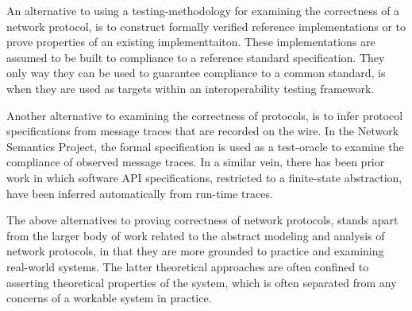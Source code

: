 \documentclass[acmsmall,review,authorversion]{acmart}
\begin{document}
{An alternative to using a testing-methodology for examining the correctness of a network protocol, is to construct formally verified reference implementations or to prove properties of an existing implementtaiton. These implementations are assumed to be built to compliance to a reference standard specification. They only way they can be used to guarantee compliance to a common standard, is when they are used as targets within an interoperability testing framework. 

Another alternative to examining the correctness of protocols, is to infer protocol specifications from message traces that are recorded on the wire. In the Network Semantics Project, the formal specification is used as a test-oracle to examine the compliance of observed message traces. In a similar vein, there has been prior work in which software API specifications, restricted to a finite-state abstraction, have been inferred automatically from run-time traces. 

The above alternatives to proving correctness of network protocols, stands apart from the larger body of work related to the abstract modeling and analysis of network protocols, in that they are more grounded to practice and examining real-world systems. The latter theoretical approaches are often confined to asserting theoretical properties of the system, which is often separated from any concerns of a workable system in practice. 

}
\end{document}
